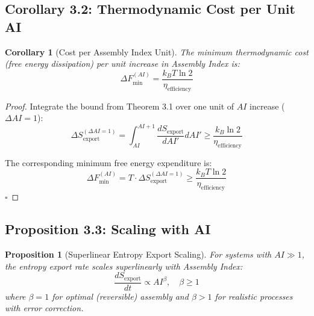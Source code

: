 \documentclass[11pt,a4paper]{article}
\newtheorem{proposition}[theorem]{Proposition}
\newtheorem{corollary}[theorem]{Corollary}
\begin{document}
\subsection{Corollary 3.2: Thermodynamic Cost per Unit AI}

\begin{corollary}[Cost per Assembly Index Unit]
The minimum thermodynamic cost (free energy dissipation) per unit increase in Assembly Index is:
\begin{equation}
\boxed{\Delta F_{\text{min}}^{(AI)} = \frac{k_B T \ln 2}{\eta_{\text{efficiency}}}}
\end{equation}
\end{corollary}

\begin{proof}
Integrate the bound from Theorem 3.1 over one unit of $AI$ increase ($\Delta AI = 1$):
\begin{equation}
\Delta S_{\text{export}}^{(\Delta AI = 1)} = \int_{AI}^{AI+1} \frac{dS_{\text{export}}}{dAI'} dAI' \geq \frac{k_B \ln 2}{\eta_{\text{efficiency}}}
\end{equation}

The corresponding minimum free energy expenditure is:
\begin{equation}
\Delta F_{\text{min}}^{(AI)} = T \cdot \Delta S_{\text{export}}^{(\Delta AI = 1)} \geq \frac{k_B T \ln 2}{\eta_{\text{efficiency}}}
\end{equation}
\hfill $\square$
\end{proof}

\subsection{Proposition 3.3: Scaling with AI}

\begin{proposition}[Superlinear Entropy Export Scaling]
For systems with $AI \gg 1$, the entropy export rate scales superlinearly with Assembly Index:
\begin{equation}
\frac{dS_{\text{export}}}{dt} \propto AI^{\beta}, \quad \beta \geq 1
\end{equation}
where $\beta = 1$ for optimal (reversible) assembly and $\beta > 1$ for realistic processes with error correction.
\end{proposition}
\end{document}
